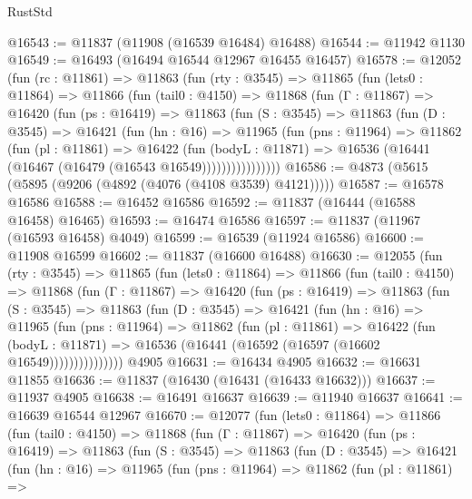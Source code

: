 \begin{lexlean}{RustStd}
\begin{coremodule}
@16543 := @11837 (@11908 (@16539 @16484) @16488)
@16544 := @11942 @1130
@16549 := @16493 (@16494 @16544 @12967 @16455 @16457)
@16578 := @12052
    (fun (rc : @11861) =>
    @11863
      (fun (rty : @3545) =>
      @11865
        (fun (lets0 : @11864) =>
        @11866
          (fun (tail0 : @4150) =>
          @11868
            (fun (Γ : @11867) =>
            @16420
              (fun (ps : @16419) =>
              @11863
                (fun (S : @3545) =>
                @11863
                  (fun (D : @3545) =>
                  @16421
                    (fun (hn : @16) =>
                    @11965
                      (fun (pns : @11964) =>
                      @11862
                        (fun (pl : @11861) =>
                        @16422
                          (fun (bodyL : @11871) =>
                          @16536 (@16441 (@16467 (@16479 (@16543 @16549))))))))))))))))
@16586 := @4873 (@5615 (@5895 (@9206 (@4892 (@4076 (@4108 @3539) @4121)))))
@16587 := @16578 @16586
@16588 := @16452 @16586
@16592 := @11837 (@16444 (@16588 @16458) @16465)
@16593 := @16474 @16586
@16597 := @11837 (@11967 (@16593 @16458) @4049)
@16599 := @16539 (@11924 @16586)
@16600 := @11908 @16599
@16602 := @11837 (@16600 @16488)
@16630 := @12055
    (fun (rty : @3545) =>
    @11865
      (fun (lets0 : @11864) =>
      @11866
        (fun (tail0 : @4150) =>
        @11868
          (fun (Γ : @11867) =>
          @16420
            (fun (ps : @16419) =>
            @11863
              (fun (S : @3545) =>
              @11863
                (fun (D : @3545) =>
                @16421
                  (fun (hn : @16) =>
                  @11965
                    (fun (pns : @11964) =>
                    @11862
                      (fun (pl : @11861) =>
                      @16422
                        (fun (bodyL : @11871) =>
                        @16536 (@16441 (@16592 (@16597 (@16602 @16549)))))))))))))))
    @4905
@16631 := @16434 @4905
@16632 := @16631 @11855
@16636 := @11837 (@16430 (@16431 (@16433 @16632)))
@16637 := @11937 @4905
@16638 := @16491 @16637
@16639 := @11940 @16637
@16641 := @16639 @16544 @12967
@16670 := @12077
    (fun (lets0 : @11864) =>
    @11866
      (fun (tail0 : @4150) =>
      @11868
        (fun (Γ : @11867) =>
        @16420
          (fun (ps : @16419) =>
          @11863
            (fun (S : @3545) =>
            @11863
              (fun (D : @3545) =>
              @16421
                (fun (hn : @16) =>
                @11965
                  (fun (pns : @11964) =>
                  @11862
                    (fun (pl : @11861) =>

\end{coremodule}
\end{lexlean}
